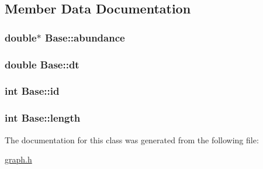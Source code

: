 \subsection{Member Data Documentation}
\hypertarget{class_base_a262c09f4273320c819d77ec15a895980}{
\subsubsection[{abundance}]{\setlength{\rightskip}{0pt plus 5cm}double$\ast$ Base\-::abundance\hspace{0.3cm}{\ttfamily [protected]}}}\label{class_base_a262c09f4273320c819d77ec15a895980}
\hypertarget{class_base_a4c2c4261e4f2d0e7ebaf93bde00d3a26}{
\subsubsection[{dt}]{\setlength{\rightskip}{0pt plus 5cm}double Base\-::dt\hspace{0.3cm}{\ttfamily [protected]}}}\label{class_base_a4c2c4261e4f2d0e7ebaf93bde00d3a26}
\hypertarget{class_base_af46b05bd03228ba15d40a05c15abffa0}{
\subsubsection[{id}]{\setlength{\rightskip}{0pt plus 5cm}int Base\-::id\hspace{0.3cm}{\ttfamily [protected]}}}\label{class_base_af46b05bd03228ba15d40a05c15abffa0}
\hypertarget{class_base_afc939d650ee448e4b9e9302fdd8e6dae}{
\subsubsection[{length}]{\setlength{\rightskip}{0pt plus 5cm}int Base\-::length\hspace{0.3cm}{\ttfamily [protected]}}}\label{class_base_afc939d650ee448e4b9e9302fdd8e6dae}


The documentation for this class was generated from the following file\-:\begin{DoxyCompactItemize}
\item 
\hyperlink{graph_8h}{graph.\-h}\end{DoxyCompactItemize}
